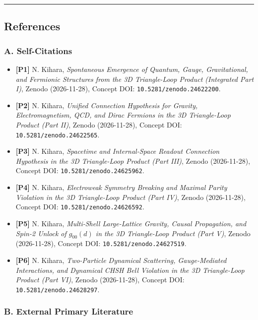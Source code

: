 \documentclass[
  a4paper,
]{article}
\providecommand{\tightlist}{%
  \setlength{\itemsep}{0pt}\setlength{\parskip}{0pt}}
\begin{document}
\begin{center}\rule{0.5\linewidth}{0.5pt}\end{center}

\subsection{References}\label{references}

\subsubsection{A. Self-Citations}\label{a.-self-citations}

\begin{itemize}
\tightlist
\item
  \textbf{{[}P1{]}} N. Kihara, \emph{Spontaneous Emergence of Quantum,
  Gauge, Gravitational, and Fermionic Structures from the 3D
  Triangle-Loop Product (Integrated Part I)}, Zenodo (2026-11-28),
  Concept DOI: \texttt{10.5281/zenodo.24622200}.
\item
  \textbf{{[}P2{]}} N. Kihara, \emph{Unified Connection Hypothesis for
  Gravity, Electromagnetism, QCD, and Dirac Fermions in the 3D
  Triangle-Loop Product (Part II)}, Zenodo (2026-11-28), Concept DOI:
  \texttt{10.5281/zenodo.24622565}.
\item
  \textbf{{[}P3{]}} N. Kihara, \emph{Spacetime and Internal-Space
  Readout Connection Hypothesis in the 3D Triangle-Loop Product (Part
  III)}, Zenodo (2026-11-28), Concept DOI:
  \texttt{10.5281/zenodo.24625962}.
\item
  \textbf{{[}P4{]}} N. Kihara, \emph{Electroweak Symmetry Breaking and
  Maximal Parity Violation in the 3D Triangle-Loop Product (Part IV)},
  Zenodo (2026-11-28), Concept DOI: \texttt{10.5281/zenodo.24626592}.
\item
  \textbf{{[}P5{]}} N. Kihara, \emph{Multi-Shell Large-Lattice Gravity,
  Causal Propagation, and Spin-2 Unlock of \(g_{00}(d)\) in the 3D
  Triangle-Loop Product (Part V)}, Zenodo (2026-11-28), Concept DOI:
  \texttt{10.5281/zenodo.24627519}.
\item
  \textbf{{[}P6{]}} N. Kihara, \emph{Two-Particle Dynamical Scattering,
  Gauge-Mediated Interactions, and Dynamical CHSH Bell Violation in the
  3D Triangle-Loop Product (Part VI)}, Zenodo (2026-11-28), Concept DOI:
  \texttt{10.5281/zenodo.24628297}.
\end{itemize}

\subsubsection{B. External Primary
Literature}\label{b.-external-primary-literature}
\end{document}
